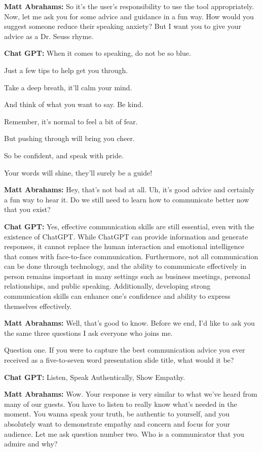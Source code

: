 \documentclass{article}
\begin{document}
\textbf{Matt Abrahams: }So it’s the user’s responsibility to use the tool appropriately. Now, let me ask you for some advice and guidance in a fun way. How would you suggest someone reduce their speaking anxiety? But I want you to give your advice as a Dr. Seuss rhyme.

\textbf{Chat GPT: }When it comes to speaking, do not be so blue.

Just a few tips to help get you through.

Take a deep breath, it’ll calm your mind.

And think of what you want to say. Be kind.

Remember, it’s normal to feel a bit of fear.

But pushing through will bring you cheer.

So be confident, and speak with pride.

Your words will shine, they’ll surely be a guide!

\textbf{Matt Abrahams: }Hey, that’s not bad at all. Uh, it’s good advice and certainly a fun way to hear it. Do we still need to learn how to communicate better now that you exist?

\textbf{Chat GPT: }Yes, effective communication skills are still essential, even with the existence of ChatGPT. While ChatGPT can provide information and generate responses, it cannot replace the human interaction and emotional intelligence that comes with face-to-face communication. Furthermore, not all communication can be done through technology, and the ability to communicate effectively in person remains important in many settings such as business meetings, personal relationships, and public speaking. Additionally, developing strong communication skills can enhance one’s confidence and ability to express themselves effectively.

\textbf{Matt Abrahams: }Well, that’s good to know. Before we end, I’d like to ask you the same three questions I ask everyone who joins me.

Question one. If you were to capture the best communication advice you ever received as a five-to-seven word presentation slide title, what would it be?

\textbf{Chat GPT: }Listen, Speak Authentically, Show Empathy.

\textbf{Matt Abrahams: }Wow. Your response is very similar to what we’ve heard from many of our guests. You have to listen to really know what’s needed in the moment. You wanna speak your truth, be authentic to yourself, and you absolutely want to demonstrate empathy and concern and focus for your audience. Let me ask question number two. Who is a communicator that you admire and why?
\end{document}
